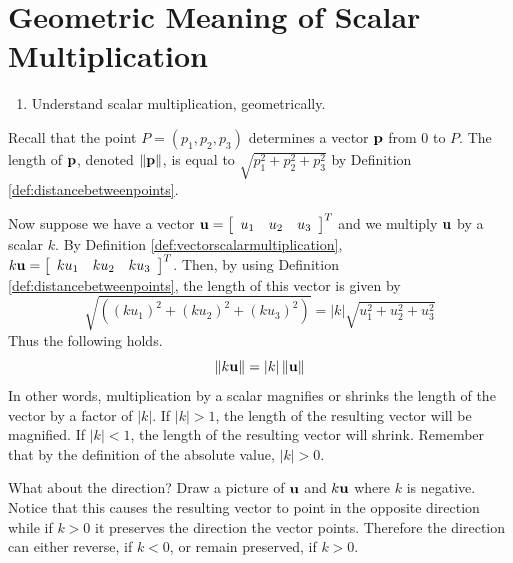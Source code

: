 \section{Geometric Meaning of Scalar Multiplication}

\begin{outcome}

\begin{enumerate}

\item[A.] Understand scalar multiplication, geometrically.

\end{enumerate}
\end{outcome}

Recall that the point $P=\left( p_{1},p_{2},p_{3}\right) $ determines
a vector $\mathbf{p}$ from $0$ to $P$. The length of $\mathbf{p}$, denoted $\|
\mathbf{p} \| $, is equal to $
\sqrt{p_{1}^{2}+p_{2}^{2}+p_{3}^{2}}$ by Definition \ref{def:distancebetweenpoints}.  

Now suppose we have a vector $\mathbf{u} = \left[ 
\begin{array}{lll}
u_1 &  u_2 & u_3 
\end{array}
\right]^T$ and we multiply $\mathbf{u}$ by a
scalar $k$. By Definition \ref{def:vectorscalarmultiplication},
$k\mathbf{u} = \left[
\begin{array}{rrr}
ku_{1} & ku_{2} & ku_{3}
\end{array}
\right]^T $. 
Then, by using Definition \ref{def:distancebetweenpoints}, the length of this vector is given by 
\begin{equation*}
\sqrt{\left( \left( k u_{1}\right) ^{2}+\left( k u_{2}\right)
^{2}+\left( k u_{3}\right) ^{2}\right) }=\left\vert k \right\vert
\sqrt{u_{1}^{2}+u_{2}^{2}+u_{3}^{2}}
\end{equation*}
Thus the following holds.
\begin{equation*}
\| k \mathbf{u} \| =\left\vert k \right\vert
\| \mathbf{u} \| 
\end{equation*}
In other words, multiplication by a scalar magnifies or shrinks the length
of the vector by a factor of $\left\vert k \right\vert$. If $\left\vert k \right\vert > 1$, the length of the resulting vector will 
be magnified. If $\left\vert k \right\vert <1$, the length of the resulting vector will shrink. Remember that by the definition 
of the absolute value, $\left\vert k \right\vert >0$. 

What about the direction? Draw a picture of $\mathbf{u}$ and $k\mathbf{u}$
where $k$ is negative. Notice that this causes the resulting vector
to point in the opposite direction while if $k >0$ it preserves the
direction the vector points. Therefore the direction can either
reverse, if $k < 0$, or remain preserved, if $k > 0$.

